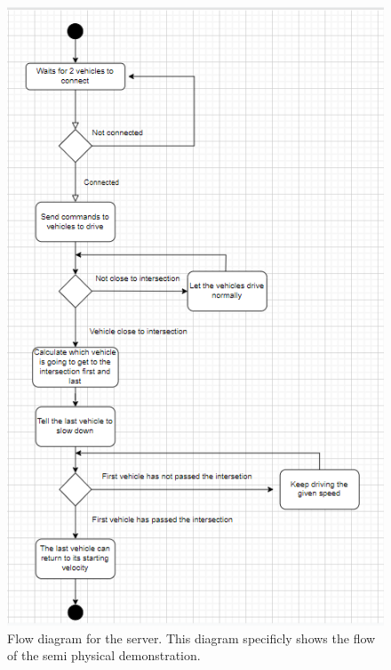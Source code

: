 \begin{figure}[h!]
	\centering
	\includegraphics[width=1\linewidth]{figures/Flow_diagram_server}
	\caption[Flow diagram server]{Flow diagram for the server. This diagram specificly shows the flow of the semi physical demonstration.}
	\label{fig:diagramserver}
\end{figure}
\clearpage
%
%
%
%
% 


%
% 
% 
% 
% 


